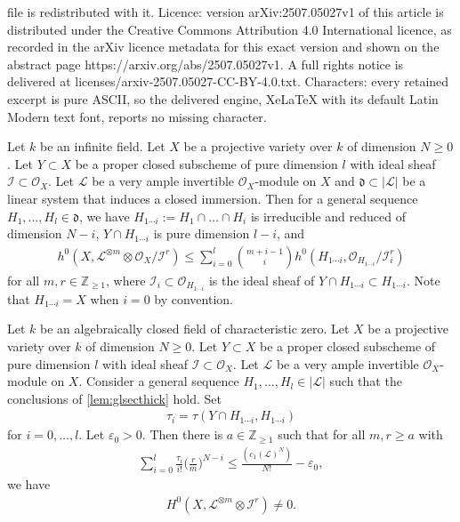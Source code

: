 \documentclass[10pt,a4paper]{amsart}
\def\I{{ \mathcal{I}}}
\def\L{{ \mathcal{L}}}
\def\O{{ \mathcal{O}}}
\def\Z{{\mathbb Z}}
\def\dd{{ \mathfrak{d}}}
\newcommand{\e}{\varepsilon}
\begin{document}
file is redistributed with it. Licence: version arXiv:2507.05027v1 of this article is distributed under the Creative Commons Attribution 4.0 International licence, as recorded in the arXiv licence metadata for this exact version and shown on the abstract page https://arxiv.org/abs/2507.05027v1. A full rights notice is delivered at licenses/arxiv-2507.05027-CC-BY-4.0.txt. Characters: every retained excerpt is pure ASCII, so the delivered engine, XeLaTeX with its default Latin Modern text font, reports no missing character.
\begin{lemma}\label{lem:glsecthick}
Let $k$ be an infinite field.
Let $X$ be a projective variety over $k$ of dimension $N \geq 0$.
Let $Y \subset X$ be a proper closed subscheme of pure dimension $l$ with ideal sheaf $ \I \subset \O_{X}$.
Let $ \mathcal{L}$ be a very ample invertible $\O_{X}$-module on $X$
and $\dd \subset |\L|$ be a linear system that induces a closed immersion.
Then for a general sequence $H_{1}, \dots, H_{l} \in \dd$, we have
$H_{1\cdots i}:= H_{1} \cap \dots \cap H_{i}$ is irreducible and reduced of dimension $N-i$,
$Y \cap H_{1\cdots i}$ is pure dimension $l - i$, and
\begin{align}
h^{0}(X, \mathcal{L}^{\otimes m} \otimes \O_{X}/\I^{r}) \leq \sum_{i=0}^{l} \binom{m+i-1}{i} h^{0}(H_{1\cdots i}, \O_{H_{1\cdots i}}/\I_{i}^{r})
\end{align}
for all $m, r \in \Z_{\geq 1}$,
where $\I_{i} \subset \O_{H_{1\cdots i}}$ is the ideal sheaf of $Y \cap H_{1\cdots i} \subset H_{1\cdots i}$.
Note that $H_{1\cdots i} = X$ when $i=0$ by convention.
\end{lemma}

\begin{proposition}\label{prop:existencevansectau}
Let $k$ be an algebraically closed field of characteristic zero.
Let $X$ be a projective variety over $k$ of dimension $N \geq 0$.
Let $Y \subset X$ be a proper closed subscheme of pure dimension $l$ with ideal sheaf $ \I \subset \O_{X}$.
Let $ \mathcal{L}$ be a very ample invertible $\O_{X}$-module on $X$.
Consider a general sequence $H_{1}, \dots, H_{l} \in | \mathcal{L}|$ such that the conclusions of \cref{lem:glsecthick} hold.
Set 
\begin{align}
\tau_{i} = \tau(Y\cap  H_{1\cdots i} ,  H_{1\cdots i})
\end{align}
for $i=0,\dots, l$.
Let $\e_{0} > 0$.
Then there is $a \in \Z_{\geq 1}$ such that for all $m,r \geq a$ with
\begin{align}
\sum_{i=0}^{l} \frac{\tau_{i}}{i !} \bigg( \frac{r}{m} \bigg)^{N-i} \leq \frac{ (c_{1}( \mathcal{L})^{N}) }{N!} - \e_{0}, \label{eq:condonrm}
\end{align}
we have
\begin{align}
H^{0}(X, \mathcal{L}^{\otimes m} \otimes \I^{r}) \neq 0.
\end{align}
\end{proposition}
\end{document}
